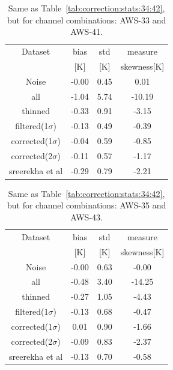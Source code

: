 \documentclass[12pt]{article}
\begin{document}
\begin{table}[!bt]
	\centering
	\begin{tabular}[b]{c|c|c|c}
		Dataset  		  &   bias &   std &   measure  \\
		&   [K]  &   [K] & skewness[K]\\
		\hline
Noise             &  -0.00 &  0.45 &               0.01 \\
all               &  -1.04 &  5.74 &             -10.19 \\
thinned           &  -0.33 &  0.91 &              -3.15 \\
filtered(1$\sigma$)   &  -0.13 &  0.49 &          -0.39 \\
corrected(1$\sigma$) &  -0.04 &  0.59 &           -0.85 \\
corrected(2$\sigma$) &  -0.11 &  0.57 &           -1.17 \\
sreerekha et al   &  -0.29 &  0.79 &              -2.21 \\		
		\hline
	\end{tabular}
	\caption{Same as Table~\ref{tab:correction:stats:34:42}, but for channel combinations: AWS-33 and AWS-41.   }
	\label{tab:correction:stats:33:41}
\end{table}

\begin{table}[!bt]
	\centering
	\begin{tabular}[b]{c|c|c|c}
		Dataset  		  &   bias &   std &   measure  \\
		&   [K]  &   [K] & skewness[K]\\
		\hline
Noise             &  -0.00 &  0.63 &              -0.00 \\
all               &  -0.48 &  3.40 &              -14.25 \\
thinned           &  -0.27 &  1.05 &              -4.43 \\
filtered(1$\sigma$)   &  -0.13 &  0.68 &          -0.47 \\
corrected(1$\sigma$) &   0.01 &  0.90 &           -1.66 \\
corrected(2$\sigma$) &  -0.09 &  0.83 &           -2.37 \\
sreerekha et al   &  -0.13 &  0.70 &              -0.58 \\

		\hline
	\end{tabular}
	\caption{Same as Table~\ref{tab:correction:stats:34:42}, but for channel combinations: AWS-35 and AWS-43.   }
	\label{tab:correction:stats:35:43}
\end{table}
\end{document}
